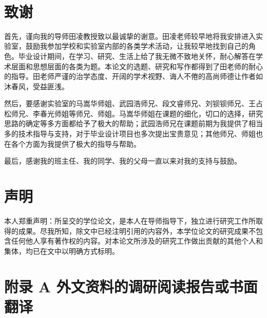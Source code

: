 \documentclass[12pt,a4paper]{article}
\newcommand{\xiaosihao}{\fontsize{12pt}{\baselineskip}\selectfont}
\newcommand{\wuhao}{\fontsize{10.5pt}{\baselineskip}\selectfont}
\begin{document}
\newpage	
{}
\listoftables

\newpage

\wuhao %
\setlength{\baselineskip}{17pt} %
\renewcommand\refname{参考文献}\

	

\newpage
\section*{致\quad 谢}


\setlength{\baselineskip}{20pt} %
\xiaosihao
{
首先，谨向我的导师田凌教授致以最诚挚的谢意。田凌老师较早地将我安排进入实验室，鼓励我参加学校和实验室内部的各类学术活动，让我较早地找到自己的角色。毕业设计期间，在学习、研究、生活上给了我无微不致地关怀，耐心解答在学术层面和思想层面的各类为题。本论文的选题、研究和写作都得到了田老师的耐心的指导。田老师严谨的治学态度、开阔的学术视野、诲人不倦的高尚师德让作者如沐春风，受益匪浅。

然后，要感谢实验室的马嵩华师姐、武园浩师兄、段文睿师兄、刘钡钡师兄、王占松师兄、李春光师姐等师兄、师姐。马嵩华师姐在课题的细化，切口的选择，研究思路的确定等多方面都给予了极大的帮助；武园浩师兄在课题前期为我提供了相当多的技术指导与支持，对于毕业设计项目也多次提出宝贵意见；其他师兄、师姐也在各个方面为我提供了极大的指导与帮助。

最后，感谢我的班主任、我的同学、我的父母一直以来对我的支持与鼓励。
}
\newpage
\section*{声\quad 明}
\xiaosihao
{
	本人郑重声明：所呈交的学位论文，是本人在导师指导下，独立进行研究工作所取得的成果。尽我所知，除文中已经注明引用的内容外，本学位论文的研究成果不包含任何他人享有著作权的内容。对本论文所涉及的研究工作做出贡献的其他个人和集体，均已在文中以明确方式标明。
	
	\vspace{1cm} 
}

\newpage

\section*{附录 A 外文资料的调研阅读报告或书面翻译}
 

\end{document}
